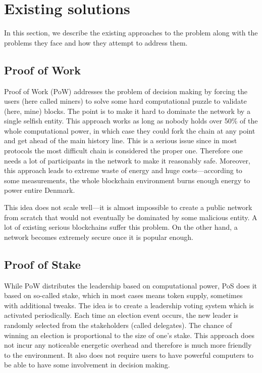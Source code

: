 \section{Existing solutions}

In this section, we describe the existing approaches to the problem along with
the problems they face and how they attempt to address them.

\subsection{Proof of Work}

Proof of Work (PoW) addresses the problem of decision making by forcing the
users (here called miners) to solve some hard computational puzzle to validate
(here, mine) blocks\cite{bitcoin}. The point is to make it hard to dominate the
network by a single selfish entity. This approach works as long as nobody holds
over 50\% of the whole computational power, in which case they could fork the
chain at any point and get ahead of the main history line. This is a serious
issue since in most protocols the most difficult chain is considered the proper
one. Therefore one needs a lot of participants in the network to make it
reasonably safe. Moreover, this approach leads to extreme waste of energy and
huge costs---according to some measurements, the whole blockchain environment
burns enough energy to power entire Denmark\cite{bitcoin_energy}.

This idea does not scale well---it is almost impossible to create a public
network from scratch that would not eventually be dominated by some malicious
entity. A lot of existing serious blockchains suffer this
problem\cite{51attack}. On the other hand, a network becomes extremely secure
once it is popular enough.

\subsection{Proof of Stake}

While PoW distributes the leadership based on computational power, PoS does it
based on so-called stake, which in most cases means token supply, sometimes with
additional tweaks\cite{peercoin}\cite{cryptocurr_without_pow}. The idea is to
create a leadership voting system which is activated periodically. Each time an
election event occurs, the new leader is randomly selected from the stakeholders
(called delegates). The chance of winning an election is proportional to the
size of one's stake. This approach does not incur any noticeable energetic
overhead and therefore is much more friendly to the environment. It also does
not require users to have powerful computers to be able to have some involvement
in decision making.

